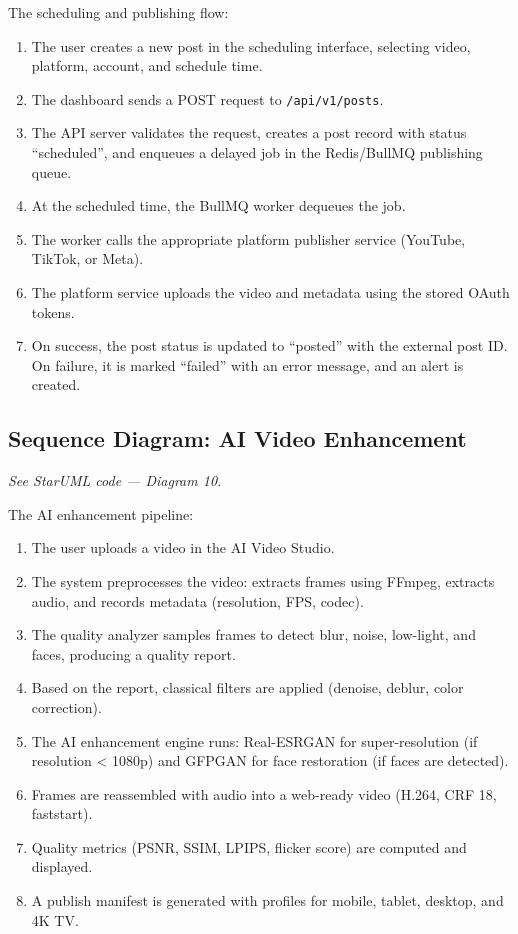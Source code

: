 The scheduling and publishing flow:
\begin{enumerate}
    \item The user creates a new post in the scheduling interface, selecting video, platform, account, and schedule time.
    \item The dashboard sends a POST request to \texttt{/api/v1/posts}.
    \item The API server validates the request, creates a post record with status ``scheduled'', and enqueues a delayed job in the Redis/BullMQ publishing queue.
    \item At the scheduled time, the BullMQ worker dequeues the job.
    \item The worker calls the appropriate platform publisher service (YouTube, TikTok, or Meta).
    \item The platform service uploads the video and metadata using the stored OAuth tokens.
    \item On success, the post status is updated to ``posted'' with the external post ID. On failure, it is marked ``failed'' with an error message, and an alert is created.
\end{enumerate}

\subsection{Sequence Diagram: AI Video Enhancement}

\noindent\textit{See StarUML code --- Diagram 10.}


The AI enhancement pipeline:
\begin{enumerate}
    \item The user uploads a video in the AI Video Studio.
    \item The system preprocesses the video: extracts frames using FFmpeg, extracts audio, and records metadata (resolution, FPS, codec).
    \item The quality analyzer samples frames to detect blur, noise, low-light, and faces, producing a quality report.
    \item Based on the report, classical filters are applied (denoise, deblur, color correction).
    \item The AI enhancement engine runs: Real-ESRGAN for super-resolution (if resolution < 1080p) and GFPGAN for face restoration (if faces are detected).
    \item Frames are reassembled with audio into a web-ready video (H.264, CRF 18, faststart).
    \item Quality metrics (PSNR, SSIM, LPIPS, flicker score) are computed and displayed.
    \item A publish manifest is generated with profiles for mobile, tablet, desktop, and 4K TV.
\end{enumerate}

